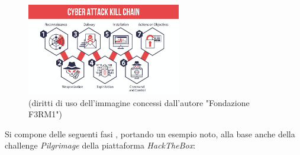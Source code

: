\begin{figure}[h]
    \centering
    \includegraphics[width=0.6\textwidth]{assets/cyber_kill_chain.png}
    \caption{(diritti di uso dell'immagine concessi dall'autore "Fondazione F3RM1")}
    \label{fig:cyber_kill_chain}
\end{figure}

Si compone delle seguenti fasi \cite{cyber_kill_chain_360}, portando un esempio noto, alla base anche della challenge \emph{Pilgrimage} della piattaforma \emph{HackTheBox}:
